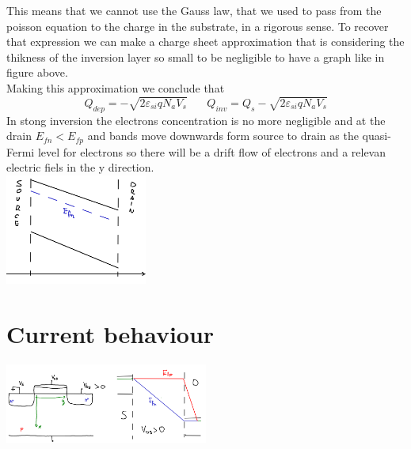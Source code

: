 This means that we cannot use the Gauss law, that we used to pass from the poisson equation to the charge in the substrate, in a rigorous sense. 
To recover that expression we can make a charge sheet approximation that is considering the thikness of the inversion layer so small to be negligible to have a graph like in figure above.\\
Making this approximation we conclude that
\begin{equation}
Q_{dep}=-\sqrt{2\varepsilon_{si}qN_aV_s} \ \ \ \ \ \ \ \ Q_{inv}=Q_s-\sqrt{2\varepsilon_{si}qN_aV_s}
\end{equation}
In stong inversion the electrons concentration is no more negligible and at the drain $E_{fn}<E_{fp}$ and bands move downwards form source to drain as the quasi-Fermi level for electrons so there will be a drift flow of electrons and a relevan electric fiels in the y direction.\\


\centering
\includegraphics[width=0.35\textwidth]{a1.png}\\
\raggedright


\vspace{3mm}
\centering
{}
\raggedright

\section{Current behaviour}


\centering
\includegraphics[width=0.5\textwidth]{a2.png}\\
\raggedright


